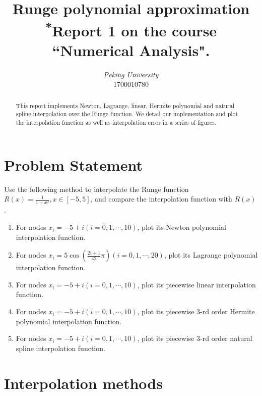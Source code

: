 \documentclass[conference]{IEEEtran}
\begin{document}
\title{Runge polynomial approximation\\
{\footnotesize \textsuperscript{*}Report 1 on the course ``Numerical Analysis".}
}

\author{
\textit{Peking University}\\
1700010780\\
}

\maketitle

\begin{abstract}
    This report implements Newton, Lagrange, linear, Hermite polynomial and natural spline interpolation over the Runge function. We detail our implementation and plot the interpolation function as well as interpolation error in a series of figures.
\end{abstract}
\section{Problem Statement}
Use the following method to interpolate the Runge function $R(x) = \frac{1}{1+x^2}, x\in [-5,5]$, and compare the interpolation function with $R(x)$.\\
\begin{enumerate}
    \item For nodes $x_i=-5+i (i=0,1,\cdots,10)$, plot its Newton polynomial interpolation function.
    \item For nodes $x_i=5\cos(\frac{2i+1}{42}\pi) (i=0,1,\cdots,20)$, plot its Lagrange polynomial interpolation function.
    \item For nodes $x_i=-5+i (i=0,1,\cdots,10)$, plot its piecewise linear interpolation function.
    \item For nodes $x_i=-5+i (i=0,1,\cdots,10)$, plot its piecewise 3-rd order Hermite polynomial interpolation function.
    \item For nodes $x_i=-5+i (i=0,1,\cdots,10)$, plot its piecewise 3-rd order natural spline interpolation function.
\end{enumerate}



\section{Interpolation methods}
\end{document}
